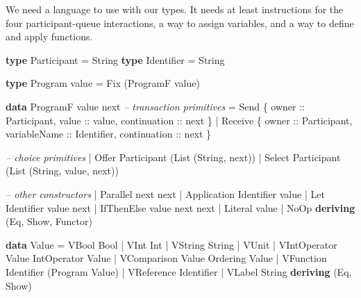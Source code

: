 \documentclass[runningheads]{llncs}
\newenvironment{Shaded}{}{}
\newcommand{\KeywordTok}[1]{\textcolor[rgb]{0.00,0.44,0.13}{\textbf{#1}}}
\newcommand{\DataTypeTok}[1]{\textcolor[rgb]{0.56,0.13,0.00}{#1}}
\newcommand{\CommentTok}[1]{\textcolor[rgb]{0.38,0.63,0.69}{\textit{#1}}}
\newcommand{\OtherTok}[1]{\textcolor[rgb]{0.00,0.44,0.13}{#1}}
\newcommand{\FunctionTok}[1]{\textcolor[rgb]{0.02,0.16,0.49}{#1}}
\newcommand{\NormalTok}[1]{#1}
\begin{document}
We need a language to use with our types. It needs at least instructions
for the four participant-queue interactions, a way to assign variables,
and a way to define and apply functions.

\begin{Shaded}
\begin{Highlighting}[]
\KeywordTok{type} \DataTypeTok{Participant} \FunctionTok{=} \DataTypeTok{String}
\KeywordTok{type} \DataTypeTok{Identifier} \FunctionTok{=} \DataTypeTok{String}

\KeywordTok{type} \DataTypeTok{Program}\NormalTok{ value }\FunctionTok{=} \DataTypeTok{Fix}\NormalTok{ (}\DataTypeTok{ProgramF}\NormalTok{ value) }

\KeywordTok{data} \DataTypeTok{ProgramF}\NormalTok{ value next }
    \CommentTok{-- transaction primitives}
    \FunctionTok{=} \DataTypeTok{Send}\NormalTok{ \{}\OtherTok{ owner ::} \DataTypeTok{Participant}\NormalTok{,}\OtherTok{ value ::}\NormalTok{ value,}\OtherTok{ continuation ::}\NormalTok{ next \}}
    \FunctionTok{|} \DataTypeTok{Receive}\NormalTok{ \{}\OtherTok{ owner ::} \DataTypeTok{Participant}\NormalTok{,}\OtherTok{ variableName ::} \DataTypeTok{Identifier}\NormalTok{,}\OtherTok{ continuation ::}\NormalTok{ next  \}}

    \CommentTok{-- choice primitives}
    \FunctionTok{|} \DataTypeTok{Offer} \DataTypeTok{Participant}\NormalTok{ (}\DataTypeTok{List}\NormalTok{ (}\DataTypeTok{String}\NormalTok{, next))}
    \FunctionTok{|} \DataTypeTok{Select} \DataTypeTok{Participant}\NormalTok{ (}\DataTypeTok{List}\NormalTok{ (}\DataTypeTok{String}\NormalTok{, value, next))}

    \CommentTok{-- other constructors }
    \FunctionTok{|} \DataTypeTok{Parallel}\NormalTok{ next next }
    \FunctionTok{|} \DataTypeTok{Application} \DataTypeTok{Identifier}\NormalTok{ value}
    \FunctionTok{|} \DataTypeTok{Let} \DataTypeTok{Identifier}\NormalTok{ value next }
    \FunctionTok{|} \DataTypeTok{IfThenElse}\NormalTok{ value next next}
    \FunctionTok{|} \DataTypeTok{Literal}\NormalTok{ value }
    \FunctionTok{|} \DataTypeTok{NoOp}
    \KeywordTok{deriving}\NormalTok{ (}\DataTypeTok{Eq}\NormalTok{, }\DataTypeTok{Show}\NormalTok{, }\DataTypeTok{Functor}\NormalTok{)}


\KeywordTok{data} \DataTypeTok{Value} 
    \FunctionTok{=} \DataTypeTok{VBool} \DataTypeTok{Bool}
    \FunctionTok{|} \DataTypeTok{VInt} \DataTypeTok{Int}
    \FunctionTok{|} \DataTypeTok{VString} \DataTypeTok{String}
    \FunctionTok{|} \DataTypeTok{VUnit}
    \FunctionTok{|} \DataTypeTok{VIntOperator} \DataTypeTok{Value} \DataTypeTok{IntOperator} \DataTypeTok{Value} 
    \FunctionTok{|} \DataTypeTok{VComparison} \DataTypeTok{Value} \DataTypeTok{Ordering} \DataTypeTok{Value}
    \FunctionTok{|} \DataTypeTok{VFunction} \DataTypeTok{Identifier}\NormalTok{ (}\DataTypeTok{Program} \DataTypeTok{Value}\NormalTok{)}
    \FunctionTok{|} \DataTypeTok{VReference} \DataTypeTok{Identifier} 
    \FunctionTok{|} \DataTypeTok{VLabel} \DataTypeTok{String}
    \KeywordTok{deriving}\NormalTok{ (}\DataTypeTok{Eq}\NormalTok{, }\DataTypeTok{Show}\NormalTok{)}
\end{Highlighting}
\end{Shaded}
\end{document}

